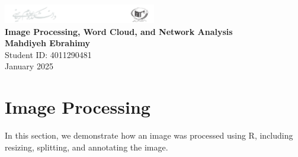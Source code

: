 \documentclass[12pt]{article}
\begin{document}
	\begin{titlepage}
		\centering
		\vspace*{5cm}
		\includegraphics[width=0.5\textwidth]{profile.png}\\[1cm]
		\Huge
		\textbf{Image Processing, Word Cloud, and Network Analysis}\\[1cm]
		\Large
		\textbf{Mahdiyeh Ebrahimy}\\
		Student ID: 4011290481\\[2cm]
		\vfill
		\large
		January 2025
	\end{titlepage}
	
	
	\tableofcontents
	\newpage
	
	\section{Image Processing}
	In this section, we demonstrate how an image was processed using R, including resizing, splitting, and annotating the image.
\end{document}
